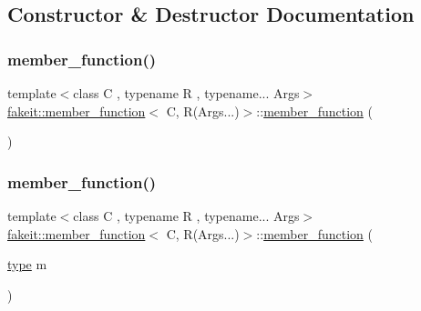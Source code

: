 \subsection{Constructor \& Destructor Documentation}
\mbox{\label{classfakeit_1_1member__function_3_01C_00_01R_07Args_8_8_8_08_4_a9ca61cf0bccaebeb9a02fb757878ce0d}} 
\subsubsection{\texorpdfstring{member\_function()}{member\_function()}\hspace{0.1cm}{\footnotesize\ttfamily [1/2]}}
{\footnotesize\ttfamily template$<$class C , typename R , typename... Args$>$ \\
\mbox{\hyperlink{classfakeit_1_1member__function}{fakeit\+::member\+\_\+function}}$<$ C, R(Args...)$>$\+::\mbox{\hyperlink{classfakeit_1_1member__function}{member\+\_\+function}} (\begin{DoxyParamCaption}{ }\end{DoxyParamCaption})\hspace{0.3cm}{\ttfamily [inline]}}

\mbox{\label{classfakeit_1_1member__function_3_01C_00_01R_07Args_8_8_8_08_4_af27ea1a8bfabd755cfe8baab03317d79}} 
\subsubsection{\texorpdfstring{member\_function()}{member\_function()}\hspace{0.1cm}{\footnotesize\ttfamily [2/2]}}
{\footnotesize\ttfamily template$<$class C , typename R , typename... Args$>$ \\
\mbox{\hyperlink{classfakeit_1_1member__function}{fakeit\+::member\+\_\+function}}$<$ C, R(Args...)$>$\+::\mbox{\hyperlink{classfakeit_1_1member__function}{member\+\_\+function}} (\begin{DoxyParamCaption}\item[{\mbox{\hyperlink{classfakeit_1_1member__function_3_01C_00_01R_07Args_8_8_8_08_4_a21761d9e5d16d880e677d266fc331aaa}{type}}}]{m }\end{DoxyParamCaption})\hspace{0.3cm}{\ttfamily [inline]}}



